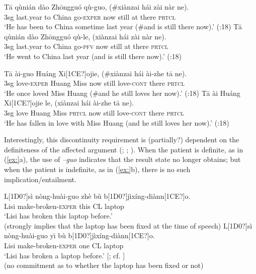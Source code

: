 \ea
\ea \gll T\=a  qùnián  dào  Zh\=ongguó  qù-guo,  (\#xiànzai  hái  zài  nàr  ne).\\
3sg  last.year  to  China  go-\textsc{exper}    now  still  at  there  \textsc{prtcl}\\
\glt ‘He has been to China sometime last year (\#and is still there now).’  (\citealt{Ma1977}:18)
\ex \gll  T\=a  qùnián  dào  Zh\=ongguó  qù-le,  (xiànzai  hái  zài  nàr  ne).\\
3sg  last.year  to  China  go-\textsc{pfv} now  still  at  there  \textsc{prtcl}\\
\glt ‘He went to China last year (and is still there now).’  (\citealt{Ma1977}:18)
\z \z

\ea
\ea \gll  T\=a  ài-guo  Huáng  Xi[1CE?]ojie,  (\#xiànzai  hái  ài-zhe  t\=a  ne).\\
3sg  love-\textsc{exper}  Huang  Miss now  still  love-\textsc{cont}  there  \textsc{prtcl}\\
\glt ‘He once loved Miss Huang (\#and he still loves her now).’  (\citealt{Ma1977}:18)
\ex \gll  T\=a  ài  Huáng  Xi[1CE?]ojie  le,  (xiànzai  hái  ài-zhe  t\=a  ne).\\
3sg  love  Huang  Miss \textsc{prtcl} now  still  love-\textsc{cont}  there  \textsc{prtcl}\\
\glt ‘He has fallen in love with Miss Huang (and he still loves her now).’  (\citealt{Ma1977}:18)
\z \z


Interestingly, this discontinuity requirement is (partially?) dependent on the definiteness of the affected argument (\citealt{Lin2007}; \citealt{Wu2008}; \citealt{Chen2009}). When the patient is definite, as in (\ref{ex:}a), the use of \textit{–guo} indicates that the result state no longer obtains; but when the patient is indefinite, as in (\ref{ex:}b), there is no such implication/entailment.


\ea
\ea  \gll L[1D0?]sì  nòng-huài-guo  zhè  bù  b[1D0?]jìxíng-diànn[1CE?]o.\\
Lisi  make-broken-\textsc{exper}  this  CL  laptop\\
\glt ‘Lisi has broken this laptop before.’\\
(strongly implies that the laptop has been fixed at the time of speech)
\ex \gll  L[1D0?]sì  nòng-huài-guo  y\={\i}  bù  b[1D0?]jìxíng-diànn[1CE?]o.\\
Lisi  make-broken-\textsc{exper}  one  CL  laptop\\
\glt ‘Lisi has broken a laptop before.’  [\citealt{Chen2009}; cf. \citealt{Lin2007}]\\
(no commitment as to whether the laptop has been fixed or not)
\z \z


